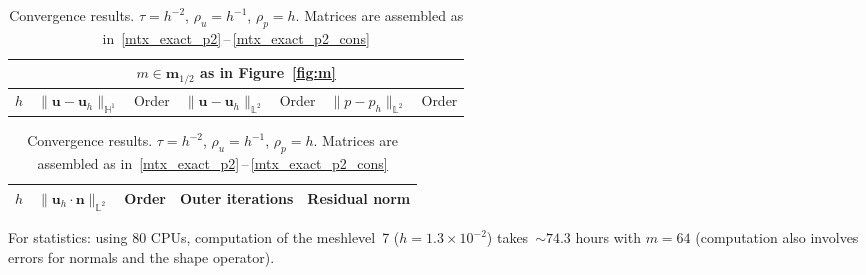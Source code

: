 \documentclass[12pt]{article}
\newcommand{\vect}[1]{\boldsymbol{\mathbf{#1}}}
\newcommand{\HOne}{{\mathbb H^1}}
\newcommand{\LTwo}{{\mathbb L^2}}
\begin{document}
\begin{table}[H]
	\centering\footnotesize
	\caption{Convergence results. $\tau = h^{-2}$, $\rho_u = h^{-1}$, $\rho_p = h$. Matrices are assembled as in~\eqref{mtx_exact_p2}\,--\,\eqref{mtx_exact_p2_cons}}
	\label{tab:p2p1_cons_h^-1}
	\begin{subtable}{1.\linewidth}\centering
		\begin{tabular}[1.3]{|c||c|c||c|c||c||c|}
			\hline
			\multicolumn{7}{|c|}{$m \in \vect m_{1/2}$ as in Figure~\ref{fig:m}} \\
			\hline
			$h$ & $\|\vect u - \vect u_h\|_{\HOne}$ & Order & $\|\vect u - \vect u_h\|_{\LTwo}$ & Order & $\|p - p_h\|_{\LTwo}$ & Order \\
			\hline
			
		\end{tabular}
	\end{subtable}
	\vskip 2mm	
	\begin{subtable}{1.\linewidth}\centering
		\begin{tabular}[1.3]{|c||c|c||c||c|}
			\hline
			$h$ & $\| \vect u_h\cdot\vect n \|_{\LTwo}$ & Order & Outer iterations & Residual norm \\
			\hline
			
		\end{tabular}
	\end{subtable}
\end{table}

For statistics: using 80 CPUs, computation of the meshlevel~7 ($h = 1.3\times10^{-2}$) takes~${\sim}74.3$ hours with $m = 64$ (computation also involves errors for normals and the shape operator).
\end{document}
